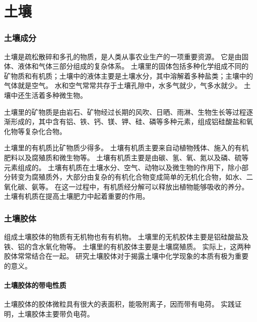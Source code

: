 \chapter{土壤}
\subsection{土壤成分}
土壤是疏松散碎和多孔的物质，是人类从事农业生产的一项重要资源。
它是由固体、液体和气体三部分组成的复杂体系。
土壤里的固体包括多种化学组成不同的矿物质和有机质；土壤中的液体主要是土壤水分，其中溶解着多种盐类；主壤中的气体就是空气。
水和空气常常共存于土壤孔隙中，水多气就少，气多水就少。
土壤中还生活着多种微生物。

土壤里的矿物质是由岩石、矿物经过长期的风吹、日晒、雨淋、生物生长等过程逐渐形成的，其中含有铝、铁、钙、镁、钾、硅、磷等多种元素，组成铝硅酸盐和氧化物等复杂化合物。

土壤里的有机质比矿物质少得多。
土壤有机质主要来自动植物残体、施入的有机肥料以及腐殖质和微生物等。
土壤有机质主要是由碳、氢、氧、氮以及磷、硫等元素组成的。
土壤有机质在土壤水分、空气、动物以及微生物的作用下，除小部分转变为腐殖质外，大部分由复杂的有机化合物变成简单的无机化合物，如水、二氧化碳、氨等。
在这一过程中，有机质经分解可以释放出植物能够吸收的养分。
土壤有机质在提高土壤肥力中起着重要的作用。

\subsection{土壤胶体}
组成土壤胶体的物质有无机物也有有机物。
土壤里的无机胶体主要是铝硅酸盐及铁、铝的含水氧化物等。
土壤里的有机胶体主要是土壤腐殖质。
实际上，这两种胶体常常结合在一起。
研究土壤胶体对于揭露土壤中化学现象的本质有极为重要的意义。

\subsubsection{土壤胶体的带电性质}
土壤胶体的胶体微粒具有很大的表面积，能吸附离子，因而带有电荷。
实践证明，土壤胶体主要带负电荷。

